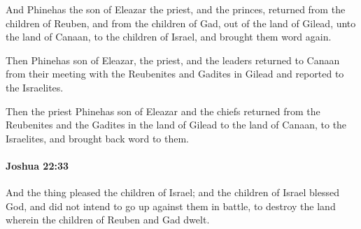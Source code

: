 			\begin{versebox}
					\item[BHS] 
					\item[ASV] And Phinehas the son of Eleazar the priest, and the princes, returned from the children of Reuben, and from the children of Gad, out of the land of Gilead, unto the land of Canaan, to the children of Israel, and brought them word again.
					\item[NIV] Then Phinehas son of Eleazar, the priest, and the leaders returned to Canaan from their meeting with the Reubenites and Gadites in Gilead and reported to the Israelites.
					\item[NRSV] Then the priest Phinehas son of Eleazar and the chiefs returned from the Reubenites and the Gadites in the land of Gilead to the land of Canaan, to the Israelites, and brought back word to them.
			\end{versebox}

		\paragraph{Joshua 22:33} %
			\label{JOSHUA-22-33}

			And the thing pleased the children of Israel; and the children of Israel blessed God, and did not intend to go up against them in battle, to destroy the land wherein the children of Reuben and Gad dwelt.

